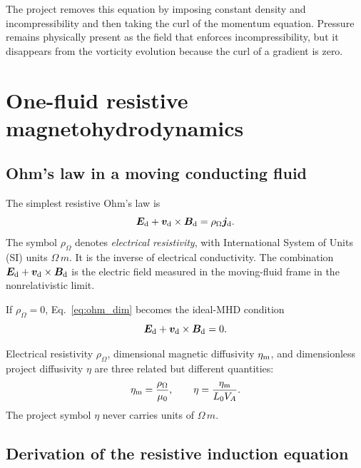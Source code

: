 The project removes this equation by imposing constant density and incompressibility and then taking the curl of the momentum equation. Pressure remains physically present as the field that enforces incompressibility, but it disappears from the vorticity evolution because the curl of a gradient is zero.

\section{One-fluid resistive magnetohydrodynamics}
\label{sec:fullmhd}

\subsection{Ohm's law in a moving conducting fluid}

The simplest resistive Ohm's law is
\begin{equation}
\bm{E}_{\rm d}+\bm{v}_{\rm d}\times\bm{B}_{\rm d}
=\rho_{\Omega}\bm{j}_{\rm d}.
\label{eq:ohm_dim}
\end{equation}
The symbol $\rho_{\Omega}$ denotes \emph{electrical resistivity}, with International System of Units (SI) units $\unit{\Omega\,m}$. It is the inverse of electrical conductivity. The combination $\bm{E}_{\rm d}+\bm{v}_{\rm d}\times\bm{B}_{\rm d}$ is the electric field measured in the moving-fluid frame in the nonrelativistic limit.

If $\rho_{\Omega}=0$, Eq.~\eqref{eq:ohm_dim} becomes the ideal-MHD condition
\begin{equation}
\bm{E}_{\rm d}+\bm{v}_{\rm d}\times\bm{B}_{\rm d}=0.
\label{eq:idealohm}
\end{equation}

\begin{warningbox}
Electrical resistivity $\rho_{\Omega}$, dimensional magnetic diffusivity $\eta_{\rm m}$, and dimensionless project diffusivity $\eta$ are three related but different quantities:
\[
\eta_{\rm m}=\frac{\rho_{\Omega}}{\mu_0},
\qquad
\eta=\frac{\eta_{\rm m}}{L_0V_A}.
\]
The project symbol $\eta$ never carries units of $\unit{\Omega\,m}$.
\end{warningbox}

\subsection{Derivation of the resistive induction equation}

